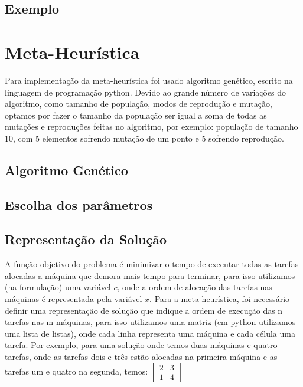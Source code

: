 \documentclass[10pt]{scrartcl}
\begin{document}
\subsection{Exemplo}


\section{Meta-Heurística}
Para implementação da meta-heurística foi usado algoritmo genético, escrito na linguagem de programação python. Devido ao grande número de variações do algoritmo, como tamanho de população, modos de reprodução e mutação, optamos por fazer o tamanho da população ser igual a soma de todas as mutações e reproduções feitas no algoritmo, por exemplo: população de tamanho 10, com 5 elementos sofrendo mutação de um ponto e 5 sofrendo reprodução. 
\subsection{Algoritmo Genético}

\subsection{Escolha dos parâmetros}

\subsection{Representação da Solução}
A função objetivo do problema é minimizar o tempo de executar todas as tarefas alocadas a máquina que demora mais tempo para terminar, para isso utilizamos (na formulação) uma variável $c$, onde a ordem de alocação das tarefas nas máquinas é representada pela variável $x$. Para a meta-heurística, foi necessário definir uma representação de solução que indique a ordem de execução das n tarefas nas m máquinas, para isso utilizamos uma matriz (em python utilizamos uma lista de listas), onde cada linha representa uma máquina e cada célula uma tarefa. Por exemplo, para uma solução onde temos duas máquinas e quatro tarefas, onde as tarefas dois e três estão alocadas na primeira máquina e as tarefas um e quatro na segunda, temos:
$
\begin{bmatrix}
2 & 3 \\
1 & 4
\end{bmatrix}
$

\end{document}
